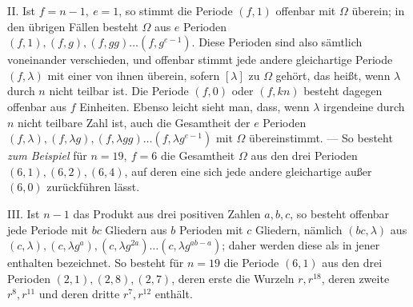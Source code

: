 II. Ist \(f=n-1,\allowbreak \ e=1\), so stimmt die Periode \((f,\allowbreak 1)\) offenbar mit \(\Omega\) überein; in den übrigen Fällen besteht \(\Omega\) aus \(e\) Perioden \((f,\allowbreak 1),\allowbreak (f,\allowbreak g),\allowbreak (f,\allowbreak gg)\ldots(f,\allowbreak g^{e-1})\). Diese Perioden sind also sämtlich voneinander verschieden, und offenbar stimmt jede andere gleichartige Periode \((f,\allowbreak \lambda)\) mit einer von ihnen überein, sofern \([\lambda]\) zu \(\Omega\) gehört, das heißt, wenn \(\lambda\) durch \(n\) nicht teilbar ist. Die Periode \((f,\allowbreak 0)\) oder \((f,\allowbreak kn)\) besteht dagegen offenbar aus \(f\) Einheiten. Ebenso leicht sieht man,
dass, wenn \(\lambda\) irgendeine durch \(n\) nicht teilbare Zahl ist, auch die Gesamtheit der \(e\) Perioden \((f,\allowbreak \lambda),\allowbreak (f,\allowbreak \lambda g),\allowbreak (f,\allowbreak \lambda gg)\ldots(f,\allowbreak \lambda g^{e-1})\) mit \(\Omega\) übereinstimmt. — So besteht \textit{zum Beispiel} für \(n=19,\allowbreak \ f=6\) die Gesamtheit \(\Omega\) aus den drei Perioden \((6,\allowbreak 1),\allowbreak (6,\allowbreak 2),\allowbreak (6,\allowbreak 4)\), auf deren eine sich jede andere gleichartige außer \((6,\allowbreak 0)\) zurückführen lässt.

III. Ist \(n-1\) das Produkt aus drei positiven Zahlen \(a,\allowbreak b,\allowbreak c\), so besteht offenbar jede Periode mit \(bc\) Gliedern aus \(b\) Perioden mit \(c\) Gliedern, nämlich \((bc,\allowbreak \lambda)\) aus \((c,\allowbreak \lambda),\allowbreak (c,\allowbreak \lambda g^a),\allowbreak (c,\allowbreak \lambda g^{2a})\ldots(c,\allowbreak \lambda g^{ab-a})\); daher werden diese als in jener enthalten bezeichnet. So besteht für \(n=19\) die Periode \((6,\allowbreak 1)\) aus den drei Perioden \((2,\allowbreak 1),\allowbreak (2,\allowbreak 8),\allowbreak (2,\allowbreak 7)\), deren erste die Wurzeln \(r,\allowbreak r^{18}\), deren zweite \(r^8,\allowbreak r^{11}\) und deren dritte \(r^7,\allowbreak r^{12}\) enthält.

